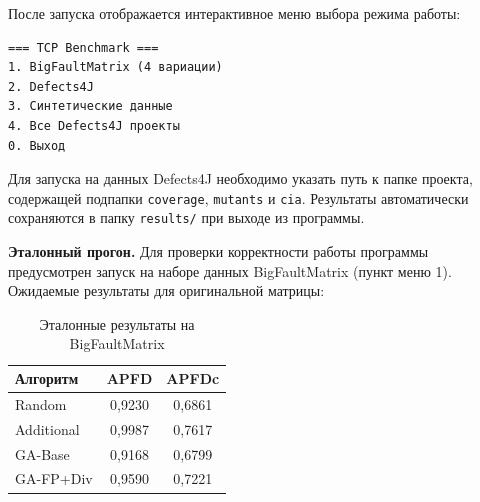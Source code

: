 После запуска отображается интерактивное меню выбора режима работы:
\begin{lstlisting}
=== TCP Benchmark ===
1. BigFaultMatrix (4 вариации)
2. Defects4J
3. Синтетические данные
4. Все Defects4J проекты
0. Выход
\end{lstlisting}

Для запуска на данных Defects4J необходимо указать путь к папке проекта, содержащей подпапки 
\texttt{coverage}, \texttt{mutants} и \texttt{cia}. Результаты автоматически сохраняются в папку 
\texttt{results/} при выходе из программы.

\textbf{Эталонный прогон.} Для проверки корректности работы программы предусмотрен запуск на наборе 
данных BigFaultMatrix (пункт меню 1). Ожидаемые результаты для оригинальной матрицы:

\begin{table}[h]
\caption{Эталонные результаты на BigFaultMatrix}
\label{tab:reference}
\begin{tabularx}{\textwidth}{|X|c|c|}
\hline
Алгоритм & APFD & APFDc \\
\hline
Random      & 0{,}9230 & 0{,}6861 \\
Additional  & 0{,}9987 & 0{,}7617 \\
GA-Base     & 0{,}9168 & 0{,}6799 \\
GA-FP+Div   & 0{,}9590 & 0{,}7221 \\
\hline
\end{tabularx}
\end{table}
